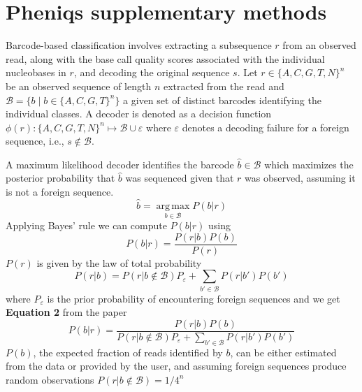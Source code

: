 \documentclass[10pt,twocolumn]{article}
\begin{document}
\section{Pheniqs supplementary methods}

Barcode-based classification involves extracting a subsequence $r$ from an observed read, along with the base call quality scores associated with the individual nucleobases in $r$, and decoding the original sequence $s$. Let $r \in \{A,C,G,T,N\}^n$ be an observed sequence of length $n$ extracted from the read and $\mathcal{B} = \{b \mid b \in \{A,C,G,T\}^n\}$ a given set of distinct barcodes identifying the individual classes. A decoder is denoted as a decision function $\phi(r):\{A,C,G,T,N\}^n \mapsto \mathcal{B} \cup \varepsilon$ where $\varepsilon$ denotes a decoding failure for a foreign sequence, i.e., $s \notin \mathcal{B}$.

A maximum likelihood decoder identifies the barcode $\hat{b} \in \mathcal{B}$ which maximizes the posterior probability that $\hat{b}$ was sequenced given that $r$ was observed, assuming it is not a foreign sequence.
%
\begin{equation}
\hat{b} = \operatorname*{arg\,max}_{b \in \mathcal{B}} P(b|r)
\end{equation}
%
Applying Bayes' rule we can compute $P(b|r)$ using
%
\begin{equation}
P(b|r) = \frac{P(r|b)P(b)}{P(r)}
\end{equation}
%
$P(r)$ is given by the law of total probability
%
\begin{equation}
P(r|b) = P(r|b \notin \mathcal{B})P_{\varepsilon} + \sum_{b' \in \mathcal{B}} P(r|b')P(b')
\end{equation}
%
where $P_\varepsilon$ is the prior probability of encountering foreign sequences and we get \textbf{Equation 2} from the paper
\begin{equation}
P(b|r) = \frac{P(r|b)P(b)}{P(r|b \notin \mathcal{B})P_{\varepsilon} + \sum_{b' \in \mathcal{B}} P(r|b')P(b')}
\end{equation}
%
$P(b)$, the expected fraction of reads identified by $b$, can be either estimated from the data or provided by the user, and assuming foreign sequences produce random observations $P(r|b \notin \mathcal{B}) = 1/4^n$
\end{document}
